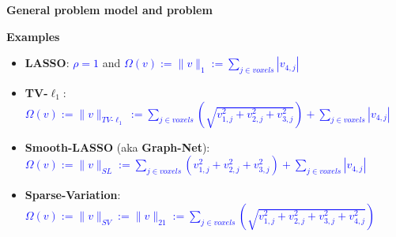 \documentclass[french]{STIC_poster}
\begin{document}
\begin{frame}[t]
\begin{columns}[t]
\begin{column}{.48\linewidth}
\begin{sxbox}[\textwidth]{\textbf{General problem model and problem}}
\begin{itemize}
\begin{itemize}
                                    \end{itemize}
                                  \begin{nbox}{\textbf{Examples}}
                                  \begin{itemize}
                                  \item \textbf{LASSO}: \textcolor{blue}{$\rho=1$} and \textcolor{blue}{$\Omega(v):=\|v\|_1:= \sum_{j\in voxels}{|v_{4,j}|}$}
                                  \item \textbf{TV-$\ell_1$}:
                                    \textcolor{blue}{$\Omega(v):=\|v\|_{TV\text{-}\ell_1}:=\sum_{j \in voxels}{\left(\sqrt{v_{1,j}^2 + v_{2,j}^2 + v_{3,j}^2}\right)} + \sum_{j \in voxels}{|v_{4,j}|}$}
                                  \item \textbf{Smooth-LASSO} (aka \textbf{Graph-Net}):\\
                                    \textcolor{blue}{$\Omega(v):=\|v\|_{SL}:=\sum_{j \in voxels}{\left(v_{1,j}^2 + v_{2,j}^2 + v_{3,j}^2\right)} + \sum_{j \in voxels}{|v_{4,j}|}$}
                                  \item \textbf{Sparse-Variation}:
                                    \textcolor{blue}{$\Omega(v):=\|v\|_{SV} := \|v\|_{21}:=\sum_{j \in voxels}{\left(\sqrt{v_{1,j}^2 + v_{2,j}^2 + v_{3,j}^2 + v_{4,j}^2}\right)}$}
                                  \end{itemize}
                                  \end{nbox}
                                  \end{itemize}

				\end{sxbox}


\end{column}
\end{columns}
\end{frame}
\end{document}
